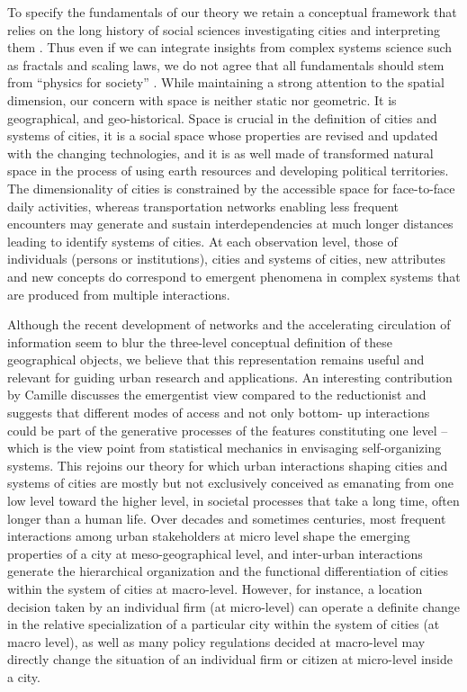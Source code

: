 \documentclass[10pt,letterpaper]{article}
\begin{document}
To specify the fundamentals of our theory we retain a conceptual framework that relies on the long history of social sciences investigating cities and interpreting them \citep{pumain1996theoriser}. Thus even if we can integrate insights from complex systems science such as fractals and scaling laws, we do not agree that all fundamentals should stem from ``physics for society'' \citep{caldarelli2018physics}. While maintaining a strong attention to the spatial dimension, our concern with space is neither static nor geometric. It is geographical, and geo-historical. Space is crucial in the definition of cities and systems of cities, it is a social space whose properties are revised and updated with the changing technologies, and it is as well made of transformed natural space in the process of using earth resources and developing political territories. The dimensionality of cities is constrained by the accessible space for face-to-face daily activities, whereas transportation networks enabling less frequent encounters may generate and sustain interdependencies at much longer distances leading to identify systems of cities. At each observation level, those of individuals (persons or institutions), cities and systems of cities, new attributes and new concepts do correspond to emergent phenomena in complex systems that are produced from multiple interactions.

Although the recent development of networks and the accelerating circulation of information seem to blur the three-level conceptual definition of these geographical objects, we believe that this representation remains useful and relevant for guiding urban research and applications. An interesting contribution by Camille \cite{roth2006reconstruction} discusses the emergentist view compared to the reductionist and suggests that different modes of access and not only bottom- up interactions could be part of the generative processes of the features constituting one level – which is the view point from statistical mechanics in envisaging self-organizing systems. This rejoins our theory for which urban interactions shaping cities and systems of cities are mostly but not exclusively conceived as emanating from one low level toward the higher level, in societal processes that take a long time, often longer than a human life. Over decades and sometimes centuries, most frequent interactions among urban stakeholders at micro level shape the emerging properties of a city at meso-geographical level, and inter-urban interactions generate the hierarchical organization and the functional differentiation of cities within the system of cities at macro-level. However, for instance, a location decision taken by an individual firm (at micro-level) can operate a definite change in the relative specialization of a particular city within the system of cities (at macro level), as well as many policy regulations decided at macro-level may directly change the situation of an individual firm or citizen at micro-level inside a city.
\end{document}
